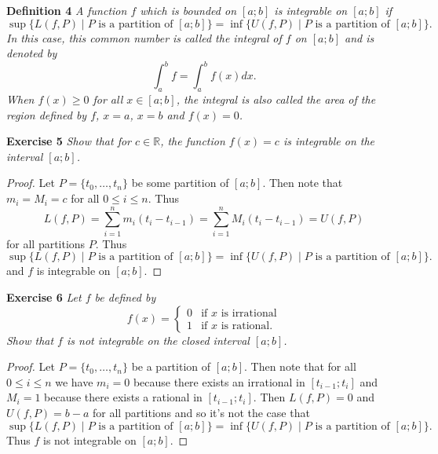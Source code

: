 \documentclass{article}
\begin{document}
\begin{flushleft}
\textbf{Definition 4}
\textsl{A function $f$ which is bounded on $[a;b]$ is integrable on $[a;b]$ if
\[
\sup \{L(f,P) \mid \text{$P$ is a partition of $[a;b]$} \} = \inf \{U(f,P) \mid \text{$P$ is a partition of $[a;b]$} \}.
\]
In this case, this common number is called the integral of $f$ on $[a;b]$ and is denoted by
\[
\int_a^b f = \int_a^b f(x) dx.
\]
When $f(x) \geq 0$ for all $x \in [a;b]$, the integral is also called the area of the region defined by $f$, $x=a$, $x=b$ and $f(x) = 0$.}\newline

\textbf{Exercise 5}
\textsl{Show that for $c \in \mathbb{R}$, the function $f(x) = c$ is integrable on the interval $[a;b]$.}
\begin{proof}
Let $P = \{t_0, \dots , t_n\}$ be some partition of $[a;b]$. Then note that $m_i = M_i = c$ for all $0 \leq i \leq n$. Thus
\[
L(f,P) = \sum_{i=1}^n m_i (t_i-t_{i-1}) = \sum_{i=1}^n M_i (t_i-t_{i-1}) = U(f,P)
\]
for all partitions $P$. Thus
\[
\sup \{L(f,P) \mid \text{$P$ is a partition of $[a;b]$} \} = \inf \{U(f,P) \mid \text{$P$ is a partition of $[a;b]$} \}.
\]
and $f$ is integrable on $[a;b]$.
\end{proof}

\textbf{Exercise 6}
\textsl{Let $f$ be defined by
\[
f(x) =
\begin{cases}
0 & \text{if $x$ is irrational}\\
1 & \text{if $x$ is rational}.
\end{cases}
\]
Show that $f$ is not integrable on the closed interval $[a;b]$.}
\begin{proof}
Let $P = \{t_0, \dots , t_n\}$ be a partition of $[a;b]$. Then note that for all $0 \leq i \leq n$ we have $m_i = 0$ because there exists an irrational in $[t_{i-1}; t_i]$ and $M_i = 1$ because there exists a rational in $[t_{i-1}; t_i]$. Then $L(f,P) = 0$ and $U(f,P) = b-a$ for all partitions and so it's not the case that
\[
\sup \{L(f,P) \mid \text{$P$ is a partition of $[a;b]$} \} = \inf \{U(f,P) \mid \text{$P$ is a partition of $[a;b]$} \}.
\]
Thus $f$ is not integrable on $[a;b]$.
\end{proof}


\end{flushleft}
\end{document}
